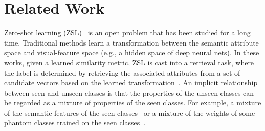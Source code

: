 \documentclass[letterpaper]{article} %
\begin{document}
\section{Related Work}
Zero-shot learning (ZSL)~\cite{Larochelle:2008:ZLN:1620163.1620172,lampert2013attribute,xian2018zero} is an open problem that has been studied for a long time.
Traditional methods learn a transformation between the semantic attribute space and visual-feature space (e.g., a hidden space of deep neural nets).
In these works, given a learned similarity metric, ZSL is cast into a retrieval task, where the label is determined by retrieving the associated attributes from a
set of candidate vectors based on the learned transformation~\cite{frome2013devise,akata2015label,akata2015evaluation,romera2015embarrassingly,kodirov2017semantic,xian2016latent,socher2013zero}.
An implicit relationship between seen and unseen classes is that the properties of the unseen classes can be regarded as a mixture of properties of the seen classes. For example, a mixture of the semantic features of the seen classes~\cite{norouzi2013zero} or a mixture of the weights of some phantom classes trained on the seen classes~\cite{changpinyo2016synthesized}.

\end{document}
